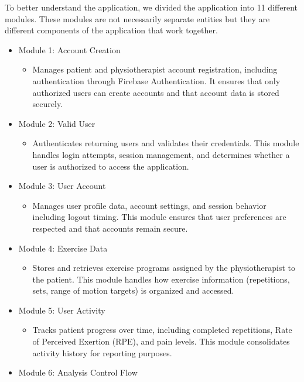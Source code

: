 \documentclass{article}
\begin{document}
To better understand the application, we divided the application into 11 different modules. These modules are not necessarily separate entities but they are different components of the application that work together.

\begin{itemize}
    \item Module 1: Account Creation
    \begin{itemize}
        \item Manages patient and physiotherapist account registration, including authentication through Firebase Authentication. It ensures that only authorized users can create accounts and that account data is stored securely.
    \end{itemize}
    \item Module 2: Valid User
    \begin{itemize}
        \item Authenticates returning users and validates their credentials. This module handles login attempts, session management, and determines whether a user is authorized to access the application.
    \end{itemize}
    \item Module 3: User Account
    \begin{itemize}
        \item Manages user profile data, account settings, and session behavior including logout timing. This module ensures that user preferences are respected and that accounts remain secure.
    \end{itemize}
    \item Module 4: Exercise Data
    \begin{itemize}
        \item Stores and retrieves exercise programs assigned by the physiotherapist to the patient. This module handles how exercise information (repetitions, sets, range of motion targets) is organized and accessed.
    \end{itemize}
    \item Module 5: User Activity
    \begin{itemize}
        \item Tracks patient progress over time, including completed repetitions, Rate of Perceived Exertion (RPE), and pain levels. This module consolidates activity history for reporting purposes.
    \end{itemize}
    \item Module 6: Analysis Control Flow

\end{itemize}
\end{document}
